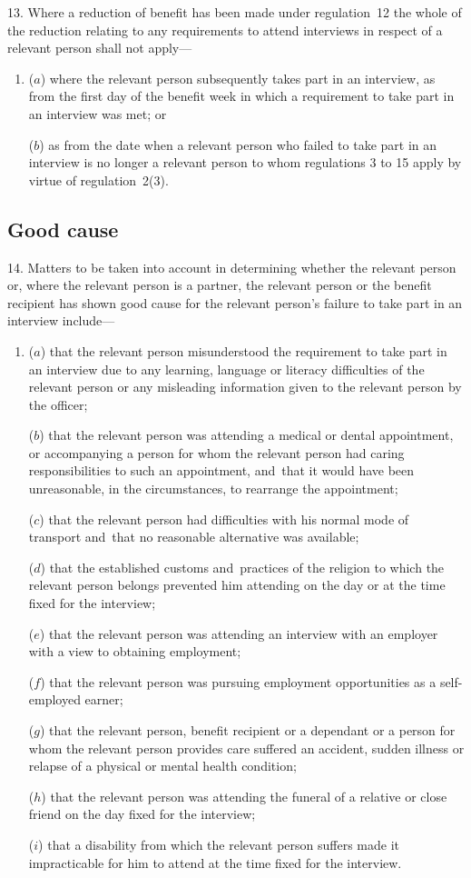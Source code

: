 \documentclass[12pt,a4paper]{article}
\begin{document}
13.  Where a reduction of benefit has been made under regulation~12 the whole of the reduction relating to any requirements to attend interviews in respect of a relevant person shall not apply—
\begin{enumerate}\item[]
($a$) where the relevant person subsequently takes part in an interview, as from the first day of the benefit week in which a requirement to take part in an interview was met; or

($b$) as from the date when a relevant person who failed to take part in an interview is no longer a relevant person to whom regulations 3 to 15 apply by virtue of regulation~2(3).
\end{enumerate}

\subsection[14. Good cause]{Good cause}

14.  Matters to be taken into account in determining whether the relevant person or, where the relevant person is a partner, the relevant person or the benefit recipient has shown good cause for the relevant person’s failure to take part in an interview include—
\begin{enumerate}\item[]
($a$) that the relevant person misunderstood the requirement to take part in an interview due to any learning, language or literacy difficulties of the relevant person or any misleading information given to the relevant person by the officer;

($b$) that the relevant person was attending a medical or dental appointment, or accompanying a person for whom the relevant person had caring responsibilities to such an appointment, and~that it would have been unreasonable, in the circumstances, to rearrange the appointment;

($c$) that the relevant person had difficulties with his normal mode of transport and~that no reasonable alternative was available;

($d$) that the established customs and~practices of the religion to which the relevant person belongs prevented him attending on the day or at the time fixed for the interview;

($e$) that the relevant person was attending an interview with an employer with a view to obtaining employment;

($f$) that the relevant person was pursuing employment opportunities as a self-employed earner;

($g$) that the relevant person, benefit recipient or a dependant or a person for whom the relevant person provides care suffered an accident, sudden illness or relapse of a physical or mental health condition;

($h$) that the relevant person was attending the funeral of a relative or close friend on the day fixed for the interview;

($i$) that a disability from which the relevant person suffers made it impracticable for him to attend at the time fixed for the interview.
\end{enumerate}
\end{document}
